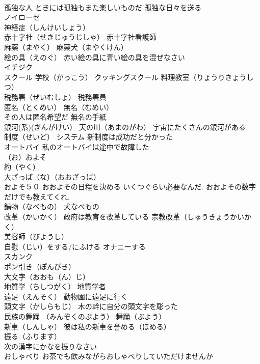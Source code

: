 \documentclass[8pt]{extreport}
\begin{document}
\begin{CJK}{UTF8}{min}
\\	孤独な人 ときには孤独もまた楽しいものだ 孤独な日々を送る
\\	ノイローゼ 
\\	神経症（しんけいしょう）
\\	赤十字社（せきじゅうじしゃ） 赤十字社看護師
\\	麻薬（まやく） 麻薬犬（まやくけん）
\\	絵の具（えのぐ） 赤い絵の具に青い絵の具を混ぜなさい
\\	イチジク
\\	スクール 学校（がっこう） クッキングスクール 料理教室（りょうりきょうしつ）
\\	税務署（ぜいむしょ） 税務署員
\\	匿名（とくめい） 無名（むめい） 
\\	その人は匿名希望だ 無名の手紙
\\	銀河(系)(ぎんがけい） 天の川（あまのがわ） 宇宙にたくさんの銀河がある
\\	制度（せいど） システム 新制度は成功だと分かった
\\	オートバイ 私のオートバイは途中で故障した
\\	（お）およそ 
\\	約（やく）
\\	大ざっぱ（な）（おおざっぱ） 
\\	およそ５０ おおよその日程を決める いくつぐらい必要なんだ. おおよその数字だけでも教えてくれ.
\\	鍋物（なべもの） 犬なべもの
\\	改革（かいかく） 政府は教育を改革している 宗教改革（しゅうきょうかいかく）
\\	美容師（びようし）
\\	自慰（じい）をする/にふける オナニーする
\\	スカンク
\\	ポン引き（ぽんびき）
\\	大文字（おおも（ん）じ）
\\	地質学（ちしつがく） 地質学者
\\	遠足（えんそく） 動物園に遠足に行く
\\	頭文字（かしらもじ） 木の幹に自分の頭文字を彫った
\\	民族の舞踊 （みんぞくのぶよう） 舞踊（ぶよう）
\\	新車（しんしゃ） 彼は私の新車を誉める（ほめる）
\\	振る（ふります）　 
\\	次の漢字にかなを振りなさい
\\	おしゃべり お茶でも飲みながらおしゃべりしていただけませんか

\end{CJK}
\end{document}
